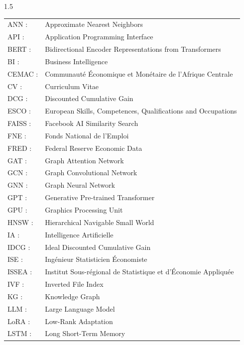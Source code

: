 \documentclass[12pt,twoside]{report}
\begin{document}
\begin{singlespace}
\begin{spacing}{1.5}
{\normalsize
\renewcommand{\arraystretch}{1.02}
\noindent\begin{tabularx}{\textwidth}{@{}p{2.5cm}X@{}}
ANN : & Approximate Nearest Neighbors \\
API : & Application Programming Interface \\
BERT : & Bidirectional Encoder Representations from Transformers \\
BI : & Business Intelligence \\
CEMAC : & Communauté Économique et Monétaire de l'Afrique Centrale \\
CV : & Curriculum Vitae \\
DCG : & Discounted Cumulative Gain \\
ESCO : & European Skills, Competences, Qualifications and Occupations \\
FAISS : & Facebook AI Similarity Search \\
FNE : & Fonds National de l'Emploi \\
FRED : & Federal Reserve Economic Data \\
GAT : & Graph Attention Network \\
GCN : & Graph Convolutional Network \\
GNN : & Graph Neural Network \\
GPT : & Generative Pre-trained Transformer \\
GPU : & Graphics Processing Unit \\
HNSW : & Hierarchical Navigable Small World \\
IA : & Intelligence Artificielle \\
IDCG : & Ideal Discounted Cumulative Gain \\
ISE : & Ingénieur Statisticien Économiste \\
ISSEA : & Institut Sous-régional de Statistique et d'Économie Appliquée \\
IVF : & Inverted File Index \\
KG : & Knowledge Graph \\
LLM : & Large Language Model \\
LoRA : & Low-Rank Adaptation \\
LSTM : & Long Short-Term Memory \\
\end{tabularx}

}
\end{spacing}
\end{singlespace}
\end{document}
